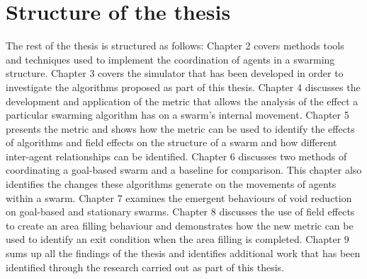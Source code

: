 \section{Structure of the thesis}
The rest of the thesis is structured as follows: Chapter 2 covers methods tools and techniques used to implement the coordination of agents in a swarming structure. Chapter 3 covers the simulator that has been developed in order to investigate the algorithms proposed as part of this thesis. Chapter 4 discusses the development and application of the metric that allows the analysis of the effect a particular swarming algorithm has on a swarm's internal movement. Chapter 5 presents the metric and shows how the metric can be used to identify the effects of algorithms and field effects on the structure of a swarm and how different inter-agent relationships can be identified. Chapter 6 discusses two methods of coordinating a goal-based swarm and a baseline for comparison. This chapter also identifies the changes these algorithms generate on the movements of agents within a swarm. Chapter 7 examines the emergent behaviours of void reduction on goal-based and stationary swarms. Chapter 8 discusses the use of field effects to create an area filling behaviour and demonstrates how the new metric can be used to identify an exit condition when the area filling is completed. Chapter 9 sums up all the findings of the thesis and identifies additional work that has been identified through the research carried out as part of this thesis.
